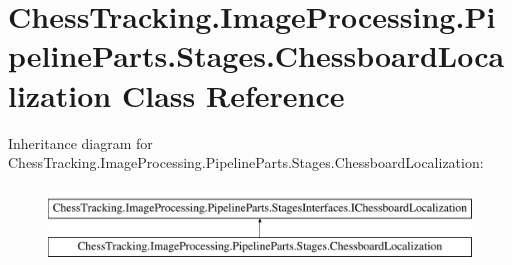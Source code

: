 \hypertarget{class_chess_tracking_1_1_image_processing_1_1_pipeline_parts_1_1_stages_1_1_chessboard_localization}{}\section{Chess\+Tracking.\+Image\+Processing.\+Pipeline\+Parts.\+Stages.\+Chessboard\+Localization Class Reference}
\label{class_chess_tracking_1_1_image_processing_1_1_pipeline_parts_1_1_stages_1_1_chessboard_localization}
Inheritance diagram for Chess\+Tracking.\+Image\+Processing.\+Pipeline\+Parts.\+Stages.\+Chessboard\+Localization\+:\begin{figure}[H]
\begin{center}
\leavevmode
\includegraphics[height=2.000000cm]{class_chess_tracking_1_1_image_processing_1_1_pipeline_parts_1_1_stages_1_1_chessboard_localization}
\end{center}
\end{figure}
